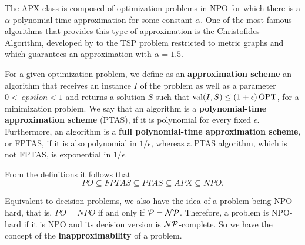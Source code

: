 The APX class is composed of optimization problems in NPO for which there is a \(\alpha\)-polynomial-time approximation for some constant \(\alpha\). One of the most famous algorithms that provides this type of approximation is the Christofides Algorithm, developed by \cite{Christofides2022WorstCaseAO} to the TSP problem restricted to metric graphs and which guarantees an approximation with \(\alpha = 1.5\).


For a given optimization problem, we define as an \textbf{approximation scheme} an algorithm that receives an instance \(I\) of the problem as well as a parameter \(0 < \ epsilon < 1\) and returns a solution \(S\) such that \(\operatorname{\textrm{val}}(I, S) \leq (1 + \epsilon) \operatorname{\textrm{OPT}}\), for a minimization problem. We say that an algorithm is a \textbf{polynomial-time approximation scheme} (PTAS), if it is polynomial for every fixed \(\epsilon\). Furthermore, an algorithm is a \textbf{full polynomial-time approximation scheme}, or FPTAS, if it is also polynomial in \(1 / \epsilon\), whereas a PTAS algorithm, which is not FPTAS, is exponential in \(1 / \epsilon\).


From the definitions it follows that $$PO \subseteq FPTAS \subseteq PTAS \subseteq APX \subseteq NPO.$$

Equivalent to decision problems, we also have the idea of a problem being NPO-hard, that is, \(PO = NPO\) if and only if \(\mathcal{P} = \mathcal{NP}\). Therefore, a problem is NPO-hard if it is NPO and its decision version is \(\mathcal{NP}\)-complete. So we have the concept of the \textbf{inapproximability} of a problem.

